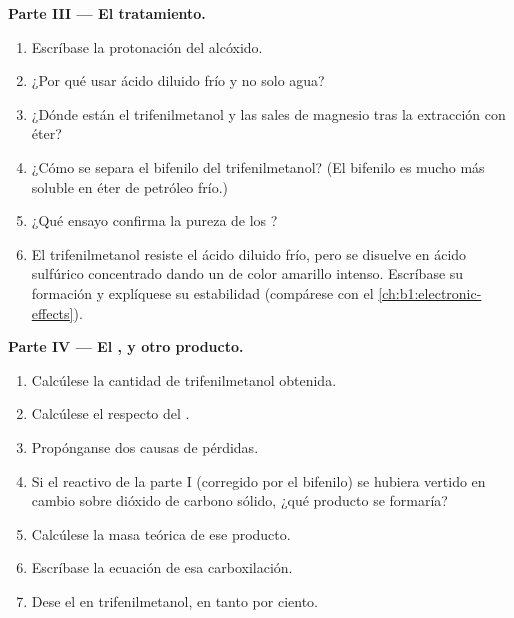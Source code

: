 \begin{problem}
\medskip
\noindent\textbf{Parte III --- El tratamiento.}
\begin{enumerate}[resume]
  \item Escríbase la protonación del alcóxido.
  \item ¿Por qué usar ácido diluido frío y no solo agua?
  \item ¿Dónde están el trifenilmetanol y las sales de magnesio tras la
        extracción con éter?
  \item ¿Cómo se separa el bifenilo del trifenilmetanol? (El bifenilo es
        mucho más soluble en éter de petróleo frío.)
  \item ¿Qué ensayo confirma la pureza de los ?
  \item El trifenilmetanol resiste el ácido diluido frío, pero se disuelve
        en ácido sulfúrico concentrado dando un  de color
        amarillo intenso. Escríbase su formación y explíquese su
        estabilidad (compárese con el
        \cref{ch:b1:electronic-effects}).
\end{enumerate}

\medskip
\noindent\textbf{Parte IV --- El , y otro producto.}
\begin{enumerate}[resume]
  \item Calcúlese la cantidad de trifenilmetanol obtenida.
  \item Calcúlese el  respecto del .
  \item Propónganse dos causas de pérdidas.
  \item Si el reactivo de la parte I (corregido por el bifenilo) se hubiera
        vertido en cambio sobre dióxido de carbono sólido, ¿qué producto
        se formaría?
  \item Calcúlese la masa teórica de ese producto.
  \item Escríbase la ecuación de esa carboxilación.
  \item Dese el  en trifenilmetanol, en tanto por ciento.
\end{enumerate}
\end{problem}
